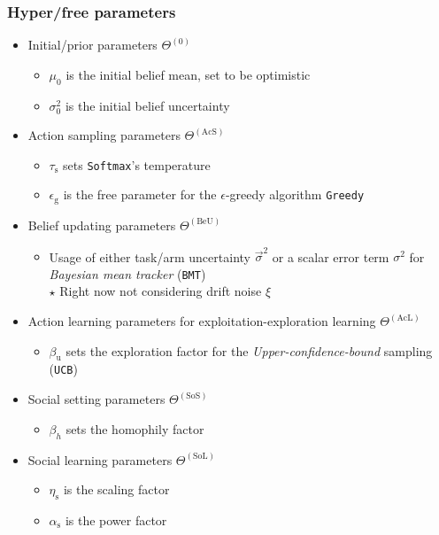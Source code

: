 \documentclass[fleqn]{article}
\begin{document}
\subsubsection*{Hyper/free parameters}

\begin{itemize}
    \item Initial/prior parameters $\Theta^{\mathrm{(0)}}$
        \begin{itemize}
            \item $\mu_0$ is the initial belief mean, set to be optimistic
            \item $\sigma^2_0$ is the initial belief uncertainty
        \end{itemize}
    \item Action sampling parameters $\Theta^{\mathrm{(AcS)}}$
        \begin{itemize}
            \item $\tau_{\mathrm{s}}$ sets \texttt{Softmax}'s temperature
            \item $\epsilon_{\mathrm{g}}$ is the free parameter for the $\epsilon$-greedy algorithm \texttt{Greedy}
        \end{itemize}
    \item Belief updating parameters $\Theta^{\mathrm{(BeU)}}$
        \begin{itemize}
            \item Usage of either
                task/arm uncertainty $\overrightarrow{\sigma}^2$
                or a scalar error term $\sigma^2$ for \textit{Bayesian mean tracker} (\texttt{BMT}) \\
            $\star$ Right now not considering drift noise $\xi$
        \end{itemize}
    \item Action learning parameters for exploitation-exploration learning $\Theta^{\mathrm{(AcL)}}$
        \begin{itemize}
            \item $\beta_{\mathrm{u}}$ sets the exploration factor for the \textit{Upper-confidence-bound} sampling (\texttt{UCB})
        \end{itemize}
    \item Social setting parameters $\Theta^{\mathrm{(SoS)}}$
        \begin{itemize}
            \item $\beta_h$ sets the homophily factor
        \end{itemize}
    \item Social learning parameters $\Theta^{\mathrm{(SoL)}}$
        \begin{itemize}
            \item $\eta_{\mathrm{s}}$ is the scaling factor
            \item $\alpha_{\mathrm{s}}$ is the power factor
        \end{itemize}
\end{itemize}
\end{document}
